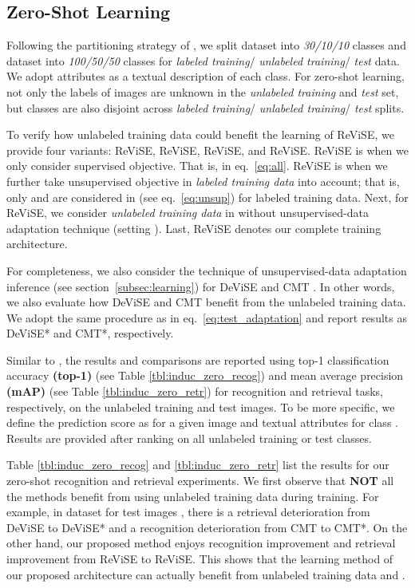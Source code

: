 {\subsection{Zero-Shot Learning}
\label{subsec:zero_learn}
{
	Following the partitioning strategy of \cite{akata2015evaluation,xian2016latent}, we split  dataset into {\em 30/10/10} classes and  dataset into {\em 100/50/50} classes for {\em labeled training}/ {\em unlabeled training}/ {\em test} data. We adopt  attributes as a textual description of each class. For zero-shot learning, not only the labels of images are unknown in the {\em unlabeled training} and {\em test} set, but classes are also disjoint across {\em labeled training}/ {\em unlabeled training}/ {\em test} splits. 


	To verify how unlabeled training data could benefit the learning of ReViSE, we provide four variants: ReViSE, ReViSE, ReViSE, and ReViSE. ReViSE is when we only consider supervised objective. That is,  in eq.~\eqref{eq:all}. ReViSE is when we further take unsupervised objective in {\em labeled training data} into account; that is, only  and  are considered in  (see eq.~\eqref{eq:unsup}) for labeled training data. Next, for ReViSE, we consider {\em unlabeled training data} in  without unsupervised-data adaptation technique (setting ). Last, ReViSE denotes our complete training architecture. 

	For completeness, we also consider the technique of unsupervised-data adaptation inference (see section~\ref{subsec:learning}) for DeViSE \cite{frome2013devise} and CMT \cite{socher2013zero}. In other words, we also evaluate how DeViSE and CMT benefit from the unlabeled training data. We adopt the same procedure as in eq.~\eqref{eq:test_adaptation} and report results as DeViSE* and CMT*, respectively.


	Similar to \cite{zhang2015zero,zhang2016zero1,zhang2016zero2}, the results and comparisons are reported using top-1 classification accuracy {\bf (top-1)} (see Table \ref{tbl:induc_zero_recog}) and mean average precision {\bf (mAP)} (see Table \ref{tbl:induc_zero_retr}) for recognition and retrieval tasks, respectively, on the unlabeled training and test images. To be more specific, we define the prediction score as \scalebox{0.9}{} for a given image  and textual attributes  for class . Results are provided after ranking  on all unlabeled training or test classes. 

	Table \ref{tbl:induc_zero_recog} and \ref{tbl:induc_zero_retr} list the results for our zero-shot recognition and retrieval experiments. We first observe that {\bf NOT} all the methods benefit from using unlabeled training data during training. For example, in  dataset for test images , there is a  retrieval deterioration from DeViSE to DeViSE* and a  recognition deterioration from CMT to CMT*. On the other hand, our proposed method enjoys  recognition improvement and  retrieval improvement from ReViSE to ReViSE. This shows that the learning method of our proposed architecture can actually benefit from unlabeled training data  and . 

}}
